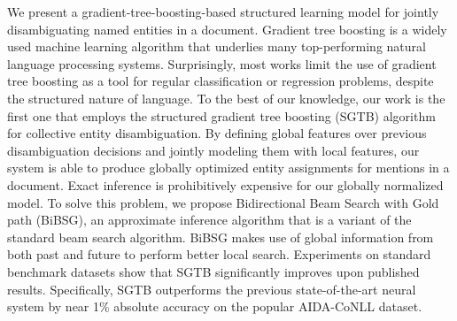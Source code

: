 We present a gradient-tree-boosting-based structured learning model for jointly disambiguating named entities in a document. Gradient tree boosting is a widely used machine learning algorithm that underlies many top-performing natural language processing systems. Surprisingly, most works limit the use of gradient tree boosting as a tool for regular classification or regression problems, despite the structured nature of language. To the best of our knowledge, our work is the first one that employs the structured gradient tree boosting (SGTB) algorithm for collective entity disambiguation. By defining global features over previous disambiguation decisions and jointly modeling them with local features, our system is able to produce globally optimized entity assignments for mentions in a document. Exact inference is prohibitively expensive for our globally normalized model. To solve this problem, we propose Bidirectional Beam Search with Gold path (BiBSG), an approximate inference algorithm that is a variant of the standard beam search algorithm. BiBSG makes use of global information from both past and future to perform better local search. Experiments on standard benchmark datasets show that SGTB significantly improves upon published results. Specifically, SGTB outperforms the previous state-of-the-art neural system by near 1\% absolute accuracy on the popular AIDA-CoNLL dataset.
